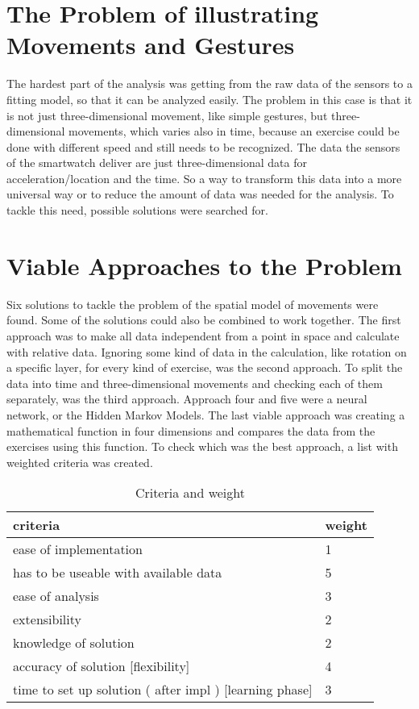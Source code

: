 \section{The Problem of illustrating Movements and Gestures}
The hardest part of the analysis was getting from the raw data of the sensors to a fitting model, so that it can be analyzed easily. The problem in this case is that it is not just three-dimensional movement, like simple gestures, but three-dimensional movements, which varies also in time, because an exercise could be done with different speed and still needs to be recognized. The data the sensors of the smartwatch deliver are just three-dimensional data for acceleration/location and the time. So a way to transform this data into a more universal way or to reduce the amount of data was needed for the analysis. To tackle this need, possible solutions were searched for.

\section{Viable Approaches to the Problem}
Six solutions to tackle the problem of the spatial model of movements were found. Some of the solutions could also be combined to work together. The first approach was to make all data independent from a point in space and calculate with relative data. Ignoring some kind of data in the calculation, like rotation on a specific layer, for every kind of exercise, was the second approach. To split the data into time and three-dimensional movements and checking each of them separately, was the third approach. Approach four and five were a neural network, or the Hidden Markov Models. The last viable approach was creating a mathematical function in four dimensions and compares the data from the exercises using this function.
\newline
\newline
To check which was the best approach, a list with weighted criteria was created.

\begin{table}[h]
\begin{tabular}{|l|l|}
\hline
	\textbf{criteria} & \textbf{weight} \\
\hline
	ease of implementation & 1\\
\hline
	has to be useable with available data & 5\\
\hline
	ease of analysis & 3\\
\hline
	extensibility & 2\\
\hline
	knowledge of solution & 2\\
\hline
	accuracy of solution [flexibility] & 4\\
\hline
	time to set up solution ( after impl )
[learning phase] & 3\\
\hline

\end{tabular}
\caption{Criteria and weight}
\end{table}

